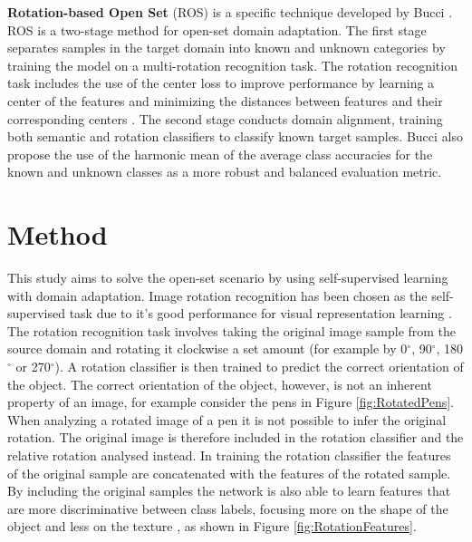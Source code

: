 \documentclass[10pt,twocolumn,letterpaper]{article}
\begin{document}
\textbf{Rotation-based Open Set} (ROS) is a specific technique developed by Bucci \etal \cite{Bucci2020}. ROS is a two-stage method for open-set domain adaptation. The first stage separates samples in the target domain into known and unknown categories by training the model on a multi-rotation recognition task. The rotation recognition task includes the use of the center loss to improve performance by learning a center of the features and minimizing the distances between features and their corresponding centers \cite{Wen2016}. The second stage conducts domain alignment, training both semantic and rotation classifiers to classify known target samples. Bucci \etal \cite{Bucci2020} also propose the use of the harmonic mean of the average class accuracies  for the known and unknown classes as a more robust and balanced evaluation metric.


\section{Method}
\label{sec:method}

This study aims to solve the open-set scenario by using self-supervised learning with domain adaptation. Image rotation recognition has been chosen as the self-supervised task due to it's good performance for visual representation learning \cite{Xu2019, Gidaris2018}. The rotation recognition task involves taking the original image sample from the source domain and rotating it clockwise a set amount (for example by 0$^{\circ}$, 90$^{\circ}$, 180$^{\circ}$ or 270$^{\circ}$). A rotation classifier is then trained to predict the correct orientation of the object. The correct orientation of the object, however, is not an inherent property of an image, for example consider the pens in Figure \ref{fig:RotatedPens}. When analyzing a rotated image of a pen it is not possible to infer the original rotation. The original image is therefore included in the rotation classifier and the relative rotation analysed instead. In training the rotation classifier the features of the original sample are concatenated with the features of the rotated sample. By including the original samples the network is also able to learn features that are more discriminative between class labels, focusing more on the shape of the object and less on the texture \cite{Bucci2020}, as shown in Figure \ref{fig:RotationFeatures}.
\end{document}

